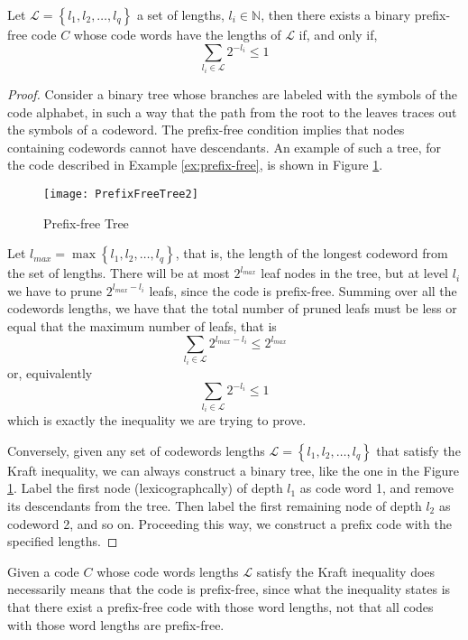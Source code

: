 \begin{theorem}
\label{th:Kraft-Inequality}
Let $\mathcal{L}=\left\{ l_{1},l_{2},\ldots,l_{q}\right\}$ a set of lengths, $l_{i}\in\mathbb{N}$, then there exists a binary prefix-free code $C$ whose code words have the lengths of $\mathcal{L}$ if, and only if,
\[
\sum_{l_{i}\in\mathcal{L}}2^{-l_{i}}\leq1
\]
\end{theorem}
\begin{proof}

Consider a binary tree whose branches are labeled with the symbols of the code alphabet, in such a way that the path from the root to the leaves traces out the symbols of a codeword. The prefix-free condition implies that nodes containing codewords cannot have descendants. An example of such a tree, for the code described in Example \ref{ex:prefix-free}, is shown in Figure \ref{fig:Prefix-Free-Tree}. 

\begin{figure}[h]
\centering\texttt{[image: PrefixFreeTree2]}
\caption{\label{fig:Prefix-Free-Tree}Prefix-free Tree}
\end{figure}

Let $l_{max}=\max \left\{ l_{1},l_{2},\ldots,l_{q}\right\}$, that is, the length of the longest codeword from the set of lengths. There will be at most $2^{l_{max}}$ leaf nodes in the tree, but at level $l_{i}$ we have to prune $2^{l_{max} - l_{i}}$ leafs, since the code is prefix-free. Summing over all the codewords lengths, we have that the total number of pruned leafs must be less or equal that the maximum number of leafs, that is
\[
\sum_{l_{i}\in\mathcal{L}}2^{l_{max}-l_{i}} \leq 2^{l_{max}}
\]
or, equivalently
\[
\sum_{l_{i}\in\mathcal{L}}2^{-l_{i}} \leq 1
\]
which is exactly the inequality we are trying to prove.

Conversely, given any set of codewords lengths $\mathcal{L}=\left\{ l_{1},l_{2},\ldots,l_{q}\right\}$ that satisfy the Kraft inequality, we can always construct a binary tree, like the one in the Figure \ref{fig:Prefix-Free-Tree}. Label the first node (lexicographcally) of depth $l_{1}$ as code word 1, and remove its descendants from the tree. Then label the first remaining node of depth $l_{2}$ as codeword 2, and so on. Proceeding this way, we construct a prefix code with the specified lengths.

\end{proof}

Given a code $C$ whose code words lengths $\mathcal{L}$ satisfy the Kraft inequality does necessarily means that the code is prefix-free, since what the inequality states is that there exist a prefix-free code with those word lengths, not that all codes with those word lengths are prefix-free.

